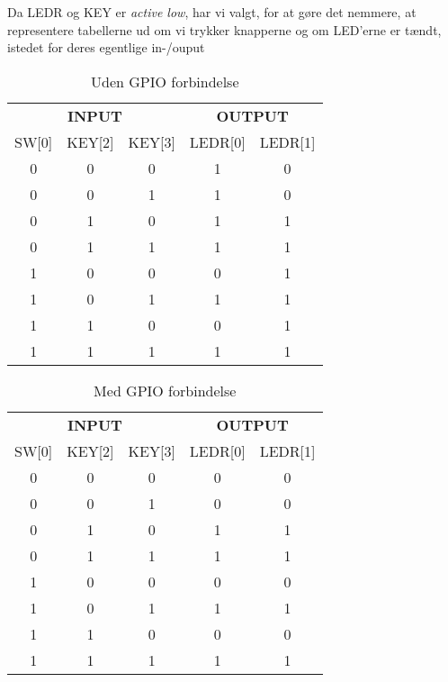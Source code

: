 \documentclass[../journal2.tex]{subfiles}
\begin{document}
Da LEDR og KEY er \textit{active low}, har vi valgt, for at gøre det nemmere, at representere tabellerne ud om vi trykker knapperne og om LED'erne er tændt, istedet for deres egentlige in-/ouput 
\begin{table}[!hbt]
    \begin{tabular}{ccc|cc}
    \multicolumn{3}{c}{\textbf{INPUT}}   &
    \multicolumn{2}{c}{\textbf{OUTPUT}} \\
    SW{[}0{]} & KEY{[}2{]} & KEY{[}3{]} & LEDR{[}0{]} & LEDR{[}1{]} \\ \hline
    0         & 0          & 0          & 1           & 0           \\
    0         & 0          & 1          & 1           & 0           \\
    0         & 1          & 0          & 1           & 1           \\
    0         & 1          & 1          & 1           & 1           \\
    1         & 0          & 0          & 0           & 1           \\
    1         & 0          & 1          & 1           & 1           \\
    1         & 1          & 0          & 0           & 1           \\
    1         & 1          & 1          & 1           & 1          
    \end{tabular}
    \centering
    \caption{Uden GPIO forbindelse}
\end{table}

\begin{table}[!hbt]
    \begin{tabular}{ccc|cc}
    \multicolumn{3}{c}{\textbf{INPUT}} & 
    \multicolumn{2}{c}{\textbf{OUTPUT}} \\
    SW{[}0{]} & KEY{[}2{]} & KEY{[}3{]} & LEDR{[}0{]} & LEDR{[}1{]} \\ \hline
    0         & 0          & 0          & 0           & 0           \\
    0         & 0          & 1          & 0           & 0           \\
    0         & 1          & 0          & 1           & 1           \\
    0         & 1          & 1          & 1           & 1           \\
    1         & 0          & 0          & 0           & 0           \\
    1         & 0          & 1          & 1           & 1           \\
    1         & 1          & 0          & 0           & 0           \\
    1         & 1          & 1          & 1           & 1          
    \end{tabular}
    \centering
    \caption{Med GPIO forbindelse}
\end{table}
\end{document}
